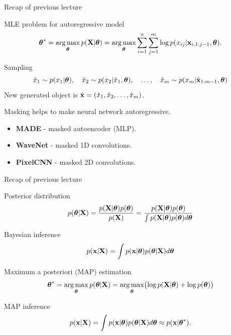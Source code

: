 

\begin{frame}
\titlepage
\end{frame}
\begin{frame}{Recap of previous lecture}
	\begin{block}{MLE problem for autoregressive model}
		\vspace{-0.7cm}
		\[
		\boldsymbol{\theta}^* = \operatorname*{arg\,max}_{\boldsymbol{\theta}} p(\mathbf{X} | \boldsymbol{\theta}) = \operatorname*{arg\,max}_{\boldsymbol{\theta}} \sum_{i=1}^n \sum_{j=1}^m \log p(x_{ij} | \mathbf{x}_{i, 1:j - 1}, \boldsymbol{\theta}).
		\]
		\vspace{-0.7cm}
	\end{block}
	\begin{block}{Sampling}
		\vspace{-0.5cm}
		\[
			\hat{x}_1 \sim p(x_1 | \boldsymbol{\theta}), \quad \hat{x}_2 \sim p(x_2 | \hat{x}_1, \boldsymbol{\theta}), \quad \dots, \quad \hat{x}_m \sim p(x_m | \hat{\mathbf{x}}_{1:m-1}, \boldsymbol{\theta})
		\]
		New generated object is $\hat{\mathbf{x}} = (\hat{x}_1, \hat{x}_2, \dots, \hat{x}_m)$.
	\end{block}
	Masking helps to make neural network autoregressive.
	\begin{itemize}
		\item \textbf{MADE} - masked autoencoder (MLP).
		\item \textbf{WaveNet} - masked 1D convolutions.
		\item \textbf{PixelCNN} - masked 2D convolutions.
	\end{itemize}
\end{frame}
\begin{frame}{Recap of previous lecture}
	\begin{block}{Posterior distribution}
		\[
		p(\boldsymbol{\theta} | \mathbf{X}) = \frac{p(\mathbf{X} | \boldsymbol{\theta}) p(\boldsymbol{\theta})}{p(\mathbf{X})} = \frac{p(\mathbf{X} | \boldsymbol{\theta}) p(\boldsymbol{\theta})}{\int p(\mathbf{X} | \boldsymbol{\theta}) p(\boldsymbol{\theta}) d \boldsymbol{\theta}} 
		\]
		\vspace{-0.2cm}
	\end{block}
	\begin{block}{Bayesian inference}
		\vspace{-0.2cm}
		\[
		p(\mathbf{x} | \mathbf{X}) = \int p(\mathbf{x} | \boldsymbol{\theta}) p(\boldsymbol{\theta} | \mathbf{X}) d \boldsymbol{\theta}
		\]
		\vspace{-0.2cm}
	\end{block}
	\begin{block}{Maximum a posteriori (MAP) estimation}
		\vspace{-0.2cm}
		\[
		\boldsymbol{\theta}^* = \operatorname*{arg\,max}_{\boldsymbol{\theta}} p(\boldsymbol{\theta} | \mathbf{X}) = \operatorname*{arg\,max}_{\boldsymbol{\theta}} \bigl(\log p(\mathbf{X} | \boldsymbol{\theta}) + \log p(\boldsymbol{\theta}) \bigr)
		\]
		\vspace{-0.2cm}
	\end{block}
	\begin{block}{MAP inference}
		\[
		p(\mathbf{x} | \mathbf{X}) = \int p(\mathbf{x}| \boldsymbol{\theta}) p(\boldsymbol{\theta} | \mathbf{X} ) d \boldsymbol{\theta} \approx p(\mathbf{x} | \boldsymbol{\theta}^*).
		\]
	\end{block}
\end{frame}
